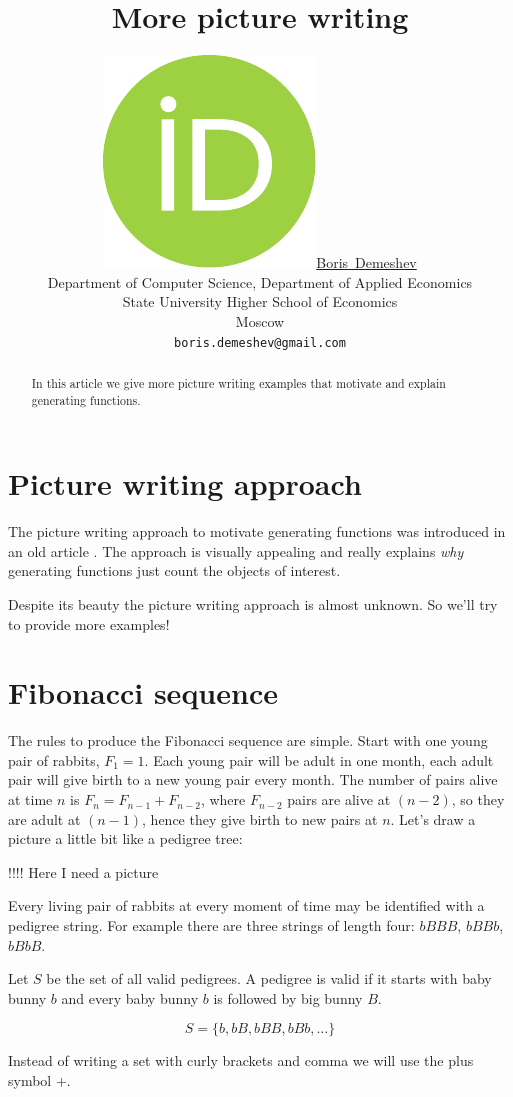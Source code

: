\documentclass{article}
\title{More picture writing}
\author{ \href{https://orcid.org/0000-0003-2284-3204}{\includegraphics[scale=0.06]{orcid.pdf}\hspace{1mm}Boris~Demeshev}\\ %
	Department of Computer Science, Department of Applied Economics\\
	State University Higher School of Economics\\
	Moscow \\
	\texttt{boris.demeshev@gmail.com} \\
}
\newcommand{\bigb}{B}
\newcommand{\babyb}{b}
\begin{document}
\maketitle

\begin{abstract}
	In this article we give more picture writing examples that motivate and explain generating functions. 
\end{abstract}


\section{Picture writing approach}

The picture writing approach to motivate generating functions was introduced in an old article \cite{polya1956picture}.
The approach is visually appealing and really explains \textit{why} generating functions just count the objects of interest.

Despite its beauty the picture writing approach is almost unknown. So we'll try to provide more examples!


\section{Fibonacci sequence}


The rules to produce the Fibonacci sequence are simple. 
Start with one young pair of rabbits, $F_1 = 1$. 
Each young pair will be adult in one month, each adult pair will give birth to a new young pair every month. 
The number of pairs alive at time $n$ is $F_n = F_{n-1} + F_{n-2}$, 
where $F_{n-2}$ pairs are alive at $(n-2)$, so they are 
adult at $(n-1)$, hence they give birth to new pairs at $n$. 
Let's draw a picture a little bit like a pedigree tree:


!!!! Here I need a picture

Every living pair of rabbits at every moment of time may be identified with a pedigree string.
For example there are three strings of length four: $\babyb\bigb\bigb\bigb$, 
$\babyb\bigb\bigb\babyb$, $\babyb\bigb\babyb\bigb$.

Let $S$ be the set of all valid pedigrees. 
A pedigree is valid if it starts with baby bunny $\babyb$ and every baby bunny $\babyb$ is followed by big bunny $\bigb$. 

\[
S = \{ \babyb, \babyb\bigb, \babyb\bigb\bigb, \babyb\bigb\babyb, \ldots \} 	
\]

Instead of writing a set with curly brackets and comma we will use the plus symbol $+$.
\end{document}
